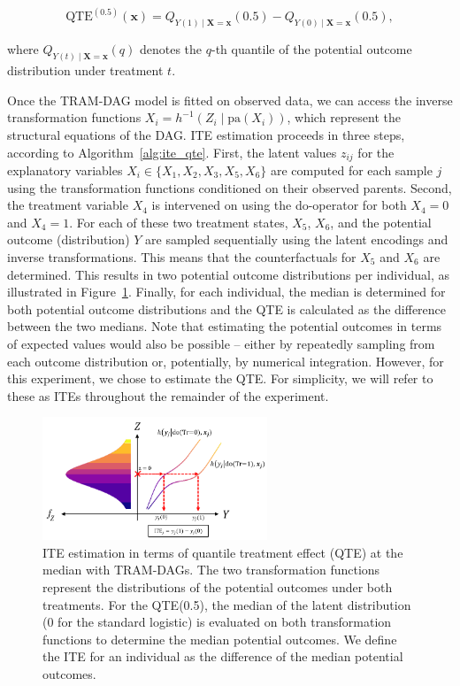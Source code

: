 \begin{equation}
\text{QTE}^{(0.5)}(\mathbf{x}) = Q_{Y(1) \mid \mathbf{X} = \mathbf{x}}(0.5) - Q_{Y(0) \mid \mathbf{X} = \mathbf{x}}(0.5),
\end{equation}


where $Q_{Y(t) \mid \mathbf{X} = \mathbf{x}}(q)$ denotes the $q$-th quantile of the potential outcome distribution under treatment $t$.

Once the TRAM-DAG model is fitted on observed data, we can access the inverse transformation functions $X_i = h^{-1}(Z_i \mid \text{pa}(X_i))$, which represent the structural equations of the DAG. ITE estimation proceeds in three steps, according to Algorithm~\ref{alg:ite_qte}. First, the latent values $z_{ij}$ for the explanatory variables $X_i \in \{X_1, X_2, X_3, X_5, X_6\}$ are computed for each sample $j$ using the transformation functions conditioned on their observed parents. Second, the treatment variable $X_4$ is intervened on using the do-operator for both $X_4 = 0$ and $X_4 = 1$. For each of these two treatment states, $X_5$, $X_6$, and the potential outcome (distribution) $Y$ are sampled sequentially using the latent encodings and inverse transformations. This means that the counterfactuals for $X_5$ and $X_6$ are determined. This results in two potential outcome distributions per individual, as illustrated in Figure~\ref{fig:exp4_potential_outcomes}. Finally, for each individual, the median is determined for both potential outcome distributions and the QTE is calculated as the difference between the two medians. Note that estimating the potential outcomes in terms of expected values would also be possible -- either by repeatedly sampling from each outcome distribution or, potentially, by numerical integration. However, for this experiment, we chose to estimate the QTE. For simplicity, we will refer to these as ITEs throughout the remainder of the experiment.


\begin{figure}[H]
\centering
\includegraphics[width=0.6\textwidth]{img/potential_outcomes_y.png}
\caption{ITE estimation in terms of quantile treatment effect (QTE) at the median with TRAM-DAGs. The two transformation functions represent the distributions of the potential outcomes under both treatments. For the QTE(0.5), the median of the latent distribution (0 for the standard logistic) is evaluated on both transformation functions to determine the median potential outcomes. We define the ITE for an individual as the difference of the median potential outcomes.}
\label{fig:exp4_potential_outcomes}
\end{figure}


